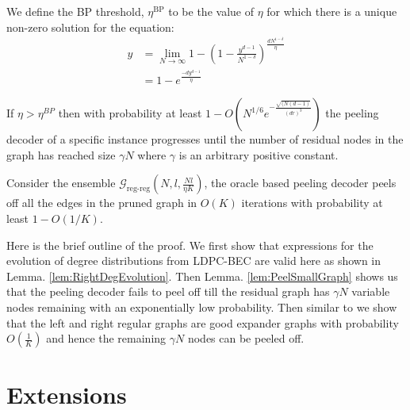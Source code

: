 \documentclass[journal,draft,onecolumn]{IEEEtran}
\begin{document}
\begin{definition}[BP Threshold]
We define the BP threshold, $\eta^{\text{BP}}$ to be the value of $\eta$ for which there is a unique non-zero solution for the equation:
\begin{align*}
y&=\lim_{N\rightarrow\infty}1-\left(1-\frac{y^{d-1}}{N^{1-\delta}}\right)^{\frac{dN^{1-\delta}}{\eta}}\\
  &=1-e^{\frac{-dy^{d-1}}{\eta}}
\end{align*}
\end{definition}

\begin{lemma}\label{lem:PeelSmallGraph}
If $\eta>\eta^{BP}$ then with probability at least $1-O\left(N^{1/6}e^{-\frac{\sqrt{(N(d-1)}}{(dr)^3}}\right)$ the peeling decoder of a specific instance progresses until the number of residual nodes in the graph has reached size $\gamma N$ where $\gamma$ is an arbitrary positive constant.
\end{lemma}

\begin{theorem}
Consider the ensemble $\mathcal{G}_{\text{reg-reg}}(N,l,\frac{Nl}{\eta K})$, the oracle based peeling decoder peels off all the edges in the pruned graph in $O(K)$ iterations with probability at least $1-O(1/K)$.
\end{theorem}
\begin{IEEEproof}
Here is the brief outline of the proof. We first show that expressions for the evolution of degree distributions from LDPC-BEC are valid here as shown in Lemma. \ref{lem:RightDegEvolution}. Then Lemma. \ref{lem:PeelSmallGraph} shows us that the peeling decoder fails to peel off till the residual graph has $\gamma N$ variable nodes remaining with an exponentially low probability. Then similar to \cite{li2015subisit} we show that the left and right regular graphs are good expander graphs with probability $O(\frac{1}{K})$ and hence the remaining $\gamma N$ nodes can be peeled off.
\end{IEEEproof}




\section{Extensions} %
%
%
\end{document}
